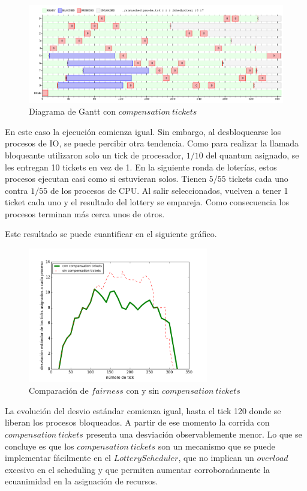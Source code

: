 \documentclass[11pt, a4paper, twoside]{article}
\begin{document}
\begin{figure}[H]
\centering
\includegraphics[width=\textwidth]{../experimentacion/ej10-compensation/gant-con.png}
\caption{Diagrama de Gantt con $compensation\ tickets$}
\end{figure}

En este caso la ejecución comienza igual. Sin embargo, al desbloquearse los procesos de IO, se puede percibir otra tendencia. Como para realizar la llamada bloqueante utilizaron solo un tick de procesador, $1/10$ del quantum asignado, se les entregan 10 tickets en vez de 1. En la siguiente ronda de loterías, estos procesos ejecutan casi como si estuvieran solos. Tienen $5/55$ tickets cada uno contra $1/55$ de los procesos de CPU. Al salir seleccionados, vuelven a tener 1 ticket cada uno y el resultado del lottery se empareja. Como consecuencia los procesos terminan más cerca unos de otros.

Este resultado se puede cuantificar en el siguiente gráfico.

\begin{figure}[H]
\centering
\includegraphics[width=0.7\textwidth]{../experimentacion/ej10-compensation/plot-comparativa.png}
\caption{Comparación de $fairness$ con y sin $compensation\ tickets$}
\end{figure}

La evolución del desvio estándar comienza igual, hasta el tick 120 donde se liberan los procesos bloqueados. A partir de ese momento la corrida con $compensation\ tickets$ presenta una desviación observablemente menor. Lo que se concluye es que los $compensation\ tickets$ son un mecanismo que se puede implementar fácilmente en el $Lottery Scheduler$, que no implican un $overload$ excesivo en el scheduling y que permiten aumentar corroboradamente la ecuanimidad en la asignación de recursos.
\end{document}
